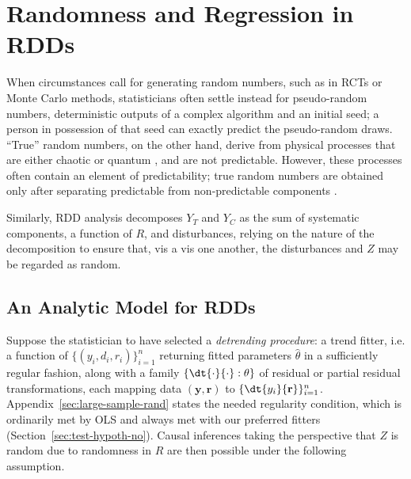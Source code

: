 \section{Randomness and Regression in RDDs}\label{sec:theMethod}


When circumstances call for generating random numbers, such as in
RCTs or Monte Carlo methods, statisticians often settle instead for
pseudo-random numbers, deterministic
outputs of a complex algorithm and an initial seed; a person in
possession of that seed can exactly predict the pseudo-random draws.
``True'' random numbers, on the other hand, derive from physical
processes that are either chaotic \citep[e.g.][]{uchida2008fast} or
quantum \citep[e.g.][]{stefanov2000optical}, and are not
predictable.  However, these processes often contain an element
of predictability; %
true random
numbers are obtained only after separating predictable from
non-predictable components \citep[see, e.g.][]{Nisan1999148}.%

Similarly, RDD analysis decomposes $Y_{T}$ and $Y_C$ as the sum of systematic
components, a function of $R$, and disturbances, relying on the nature of the decomposition to ensure
that, vis a vis one another, the disturbances and $Z$ may
be regarded as random.

\subsection{An Analytic Model for RDDs} \label{sec:model-eey-c-r}

Suppose the statistician to have selected a \textit{detrending procedure}: a
trend fitter, i.e. a function of
$\{({y}_{i},d_{i},r_{i})\}_{i=1}^{n}$ returning
fitted parameters $\hat{\theta}$ in a sufficiently regular
fashion, along with a
family $\{\dt{\cdot}{\cdot}: \theta\}$ of residual or partial
residual transformations, each mapping data $(\mathbf{y}, \mathbf{r})$ to
$\{\dt {y_{i}}{\mathbf{r}} \}_{i=1}^{n}$.
Appendix~\ref{sec:large-sample-rand}
states the
needed regularity condition, which is ordinarily met by OLS and always
met with our preferred fitters (Section~\ref{sec:test-hypoth-no}).
Causal inferences taking
the perspective that $Z$ is random due to
randomness in $R$ are then possible under the following assumption.

